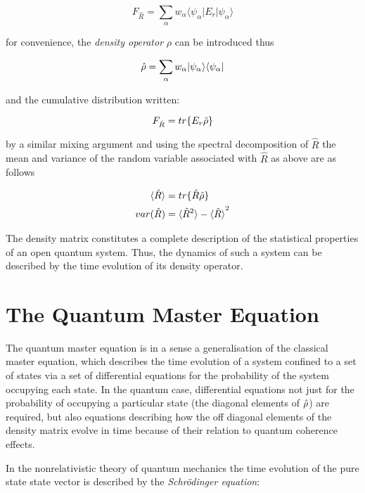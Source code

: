 \begin{equation}
  F_{\hat{R}} = \sum_\alpha w_\alpha \langle \psi_\alpha | E_r | \psi_\alpha \rangle
\end{equation}

for convenience, the \emph{density operator} $\rho$ can be introduced thus

\begin{equation}
  \hat{\rho} = \sum_\alpha w_\alpha |\psi_\alpha \rangle \langle \psi_\alpha |
\end{equation}

and the cumulative distribution written:

\begin{equation}
  F_{\hat{R}} = tr\{E_r \hat{\rho} \}
\end{equation}

by a similar mixing argument and using the spectral decomposition of $\hat{R}$ the mean and variance of the random variable associated with $\hat{R}$ as above are as follows

\begin{align}
  \langle \hat{R} \rangle &= tr\{\hat{R} \hat{\rho} \} \\
  var(\hat{R}) &= \langle \hat{R}^2 \rangle - {\langle \hat{R} \rangle}^2
\end{align}

The density matrix constitutes a complete description of the statistical properties of an open quantum system.
Thus, the dynamics of such a system can be described by the time evolution of its density operator.

\section{The Quantum Master Equation}
The quantum master equation is in a sense a generalisation of the classical master equation, which describes the time evolution of a system confined to a set of states via a set of differential equations for the probability of the system occupying each state.
In the quantum case, differential equations not just for the probability of occupying a particular state (the diagonal elements of $\hat{\rho}$) are required, but also equations describing how the off diagonal elements of the density matrix evolve in time because of their relation to quantum coherence effects.

In the nonrelativistic theory of quantum mechanics the time evolution of the pure state state vector is described by the \emph{Schr\"odinger equation}:

